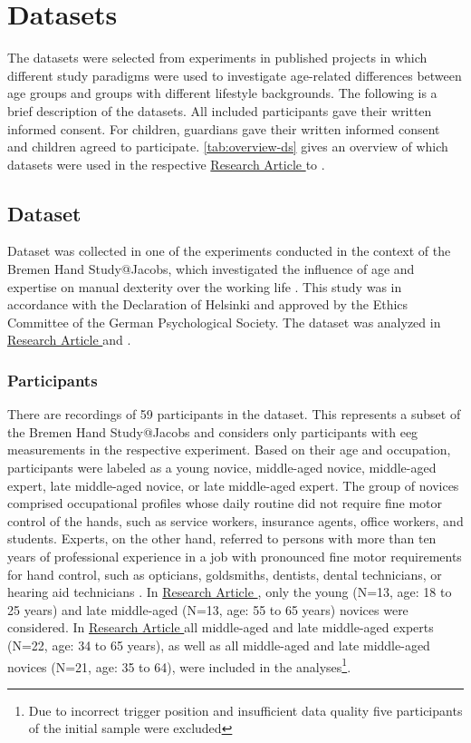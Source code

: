 \section{Datasets}
The datasets were selected from experiments in published projects in which different study paradigms were used to investigate age-related differences between age groups and groups with different lifestyle backgrounds. The following is a brief description of the datasets. All included participants gave their written informed consent. For children, guardians gave their written informed consent and children agreed to participate. \autoref{tab:overview-ds} gives an overview of which datasets were used in the respective \hyperref[results:paper1]{Research Article } to \hyperref[results:paperIV]{}. 

\subsection{Dataset }
\label{methods:datasets:I}
Dataset  was collected in one of the experiments conducted in the context of the Bremen Hand Study@Jacobs, which investigated the influence of age and expertise on manual dexterity over the working life \cite{Voelcker-Rehage2013}. This study was in accordance with the Declaration of Helsinki and approved by the Ethics Committee of the German Psychological Society. The dataset was analyzed in \hyperref[paperI]{Research Article } and \hyperref[paperIV]{}. 

\subsubsection{Participants}
\label{methods:datasets:I:participants}
There are recordings of 59 participants in the dataset. This represents a subset of the Bremen Hand Study@Jacobs and considers only participants with \gls{eeg} measurements in the respective experiment. Based on their age and occupation, participants were labeled as a young novice, middle-aged novice, middle-aged expert, late middle-aged novice, or late middle-aged expert. The group of novices comprised occupational profiles whose daily routine did not require fine motor control of the hands, such as service workers, insurance agents, office workers, and students. Experts, on the other hand, referred to persons with more than ten years of professional experience in a job with pronounced fine motor requirements for hand control, such as opticians, goldsmiths, dentists, dental technicians, or hearing aid technicians \cite{Ericsson1991}. In \hyperref[results:paperI]{Research Article }, only the young (N=13, age: 18 to 25 years) and late middle-aged (N=13, age: 55 to 65 years) novices were considered. In \hyperref[results:paperIV]{\hyperref[paperIV]{\hyperref[paperIV]{Research Article }}} all middle-aged and late middle-aged experts (N=22, age: 34 to 65 years), as well as all middle-aged and late middle-aged novices (N=21, age: 35 to 64), were included in the analyses\footnote{Due to incorrect trigger position and insufficient data quality five participants of the initial sample were excluded}.

